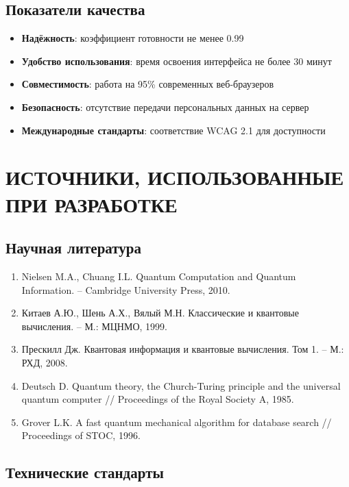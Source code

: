 \documentclass[14pt,russian]{extarticle}
\begin{document}
\subsection{Показатели качества}

\begin{itemize}
    \item \textbf{Надёжность}: коэффициент готовности не менее 0.99
    \item \textbf{Удобство использования}: время освоения интерфейса не более 30 минут
    \item \textbf{Совместимость}: работа на 95\% современных веб-браузеров
    \item \textbf{Безопасность}: отсутствие передачи персональных данных на сервер
    \item \textbf{Международные стандарты}: соответствие WCAG 2.1 для доступности
\end{itemize}

\section{ИСТОЧНИКИ, ИСПОЛЬЗОВАННЫЕ ПРИ РАЗРАБОТКЕ}

\subsection{Научная литература}

\begin{enumerate}
    \item Nielsen M.A., Chuang I.L. Quantum Computation and Quantum Information. -- Cambridge University Press, 2010.
    \item Китаев А.Ю., Шень А.Х., Вялый М.Н. Классические и квантовые вычисления. -- М.: МЦНМО, 1999.
    \item Прескилл Дж. Квантовая информация и квантовые вычисления. Том 1. -- М.: РХД, 2008.
    \item Deutsch D. Quantum theory, the Church-Turing principle and the universal quantum computer // Proceedings of the Royal Society A, 1985.
    \item Grover L.K. A fast quantum mechanical algorithm for database search // Proceedings of STOC, 1996.
\end{enumerate}

\subsection{Технические стандарты}
\end{document}
